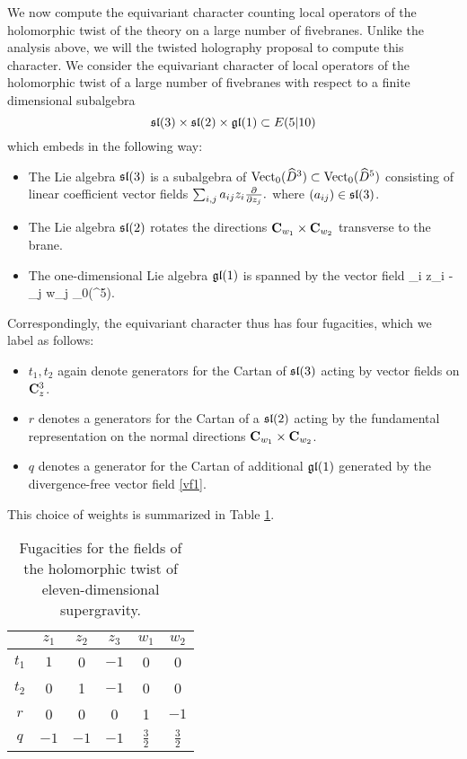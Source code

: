 We now compute the equivariant character counting local operators of the holomorphic twist of the theory on a large number of fivebranes. 
Unlike the analysis above, we will the twisted holography proposal to compute this character. We consider the equivariant character of local operators of the holomorphic twist of a large number of fivebranes with respect to a finite dimensional subalgebra
\[
\mathfrak{sl}(3)\times \mathfrak{sl}(2)\times \mathfrak{gl}(1)\subset E(5|10)
\]
which embeds in the following way:
\begin{itemize}
\item The Lie algebra $\mathfrak{sl}(3)$ is a subalgebra of $\operatorname{Vect}_0(\widehat{D}^3) \subset \operatorname{Vect}_0 (\widehat{D}^5)$ consisting of linear coefficient vector fields $\sum_{i,j} a_{ij} z_i \frac{\partial}{\partial z_j}.$
where $(a_{ij}) \in \mathfrak{sl}(3)$. 
\item The Lie algebra $\mathfrak{sl}(2)$ rotates the directions $\mathbf{C}_{w_1} \times \mathbf{C}_{w_2}$ transverse to the brane.
\item The one-dimensional Lie algebra $\mathfrak{gl}(1)$ is spanned by the vector field 
\beqn\label{vf1}
\sum_i z_i  -  \sum_{j} w_j  \in \Vect_0(^5).
\eeqn
\end{itemize}

Correspondingly, the equivariant character thus has four fugacities, which we label as follows:
\begin{itemize}
  \item $t_{1}, t_{2}$ again denote generators for the Cartan of $\mathfrak{sl}(3)$ acting by vector fields on $\mathbf{C}^{3}_{z}$.
  \item $r$ denotes a generators for the Cartan of a $\mathfrak{sl}(2)$ acting by the fundamental representation on the normal directions $\mathbf{C}_{w_1} \times \mathbf{C}_{w_2}$.
  \item $q$ denotes a generator for the Cartan of additional $\mathfrak{gl}(1)$ generated by the divergence-free vector field \eqref{vf1}. 
\end{itemize}

This choice of weights is summarized in Table \ref{tbl:sugra}.

\begin{table}
\begin{center}
\begin{tabular}{c c c c c c}
  & $z_{1}$ & $z_{2}$ & $z_{3}$ & $w_{1}$ & $w_{2}$ \\
  \hline
  $t_{1}$ & $1$ & 0 & $-1$ & 0 & 0 \\
  $t_{2}$ & 0 & 1 & $-1$ & 0 & 0 \\
  $r$ & 0 & 0 & 0 & 1 & $-1$ \\
  $q$ & $-1$ & $-1$ & $-1$ & $\frac{3}{2}$ & $\frac{3}{2}$
\end{tabular}
\caption{Fugacities for the fields of the holomorphic twist of eleven-dimensional supergravity.}
\label{tbl:sugra}
\end{center}
\end{table}

